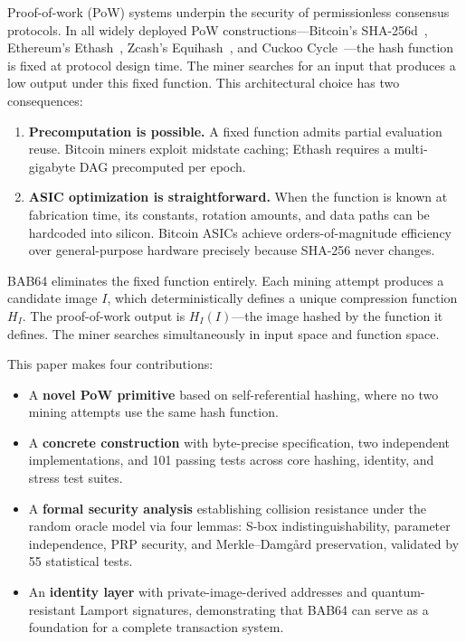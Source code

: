\documentclass[preprint]{iacrtrans}
\begin{document}
Proof-of-work (PoW) systems underpin the security of permissionless consensus protocols. In all widely deployed PoW constructions---Bitcoin's SHA-256d~\cite{nakamoto2008}, Ethereum's Ethash~\cite{buterin2014}, Zcash's Equihash~\cite{biryukov2016}, and Cuckoo Cycle~\cite{tromp2015}---the hash function is fixed at protocol design time. The miner searches for an input that produces a low output under this fixed function. This architectural choice has two consequences:

\begin{enumerate}
    \item \textbf{Precomputation is possible.} A fixed function admits partial evaluation reuse. Bitcoin miners exploit midstate caching; Ethash requires a multi-gigabyte DAG precomputed per epoch.

    \item \textbf{ASIC optimization is straightforward.} When the function is known at fabrication time, its constants, rotation amounts, and data paths can be hardcoded into silicon. Bitcoin ASICs achieve orders-of-magnitude efficiency over general-purpose hardware precisely because SHA-256 never changes.
\end{enumerate}

BAB64 eliminates the fixed function entirely. Each mining attempt produces a candidate image $I$, which deterministically defines a unique compression function $H_I$. The proof-of-work output is $H_I(I)$---the image hashed by the function it defines. The miner searches simultaneously in input space and function space.

This paper makes four contributions:

\begin{itemize}
    \item A \textbf{novel PoW primitive} based on self-referential hashing, where no two mining attempts use the same hash function.
    \item A \textbf{concrete construction} with byte-precise specification, two independent implementations, and 101 passing tests across core hashing, identity, and stress test suites.
    \item A \textbf{formal security analysis} establishing collision resistance under the random oracle model via four lemmas: S-box indistinguishability, parameter independence, PRP security, and Merkle--Damg{\aa}rd preservation, validated by 55 statistical tests.
    \item An \textbf{identity layer} with private-image-derived addresses and quantum-resistant Lamport signatures, demonstrating that BAB64 can serve as a foundation for a complete transaction system.
\end{itemize}
\end{document}
